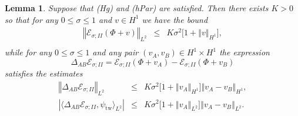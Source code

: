 \documentclass[10pt]{articleHJ}
\newcommand{\abs}[1]{\left\vert#1\right\vert}			%
\newcommand{\norm}[1]{\left\Vert#1\right\Vert}		%
\newtheorem{lem}[thm]{Lemma}
\numberwithin{equation}{section}
\begin{document}
\begin{lem}
Suppose that (Hg) and (hPar) are satisfied.
Then there exists $K > 0$
so that
for any $0 \le \sigma \le 1$
and $v\in H^1$
we have the bound
\begin{equation}
\label{eq:swv:glb:bnd:e:ii}
\begin{array}{lcl}
 \norm{\mathcal{E}_{\sigma;II}(\Phi + v)}_{L^2} & \le &
  K \sigma^2
    \big[ 1 + \norm{v}_{H^1} \big],
\\[0.2cm]
\end{array}
\end{equation}
while for any $0 \le \sigma \le 1$
and any pair $(v_A, v_B) \in H^1 \times H^1$
the expression
\begin{equation}
\Delta_{AB} \mathcal{E}_{\sigma;II}
 = \mathcal{E}_{\sigma;II}
       (\Phi + v_A  )
  - \mathcal{E}_{\sigma;II}
       (\Phi + v_B)
\end{equation}
satisfies the estimates
\begin{equation}
\label{eq:swv:lip:bnd:e:ii}
\begin{array}{lcl}
\norm{\Delta_{AB} \mathcal{E}_{\sigma;II} }_{L^2}
  & \le &
K \sigma^2
   \big[ 1 + \norm{v_A}_{H^1} \big]
     \norm{v_A-v_B}_{H^1} ,
\\[0.2cm]
\abs{\langle
\Delta_{AB} \mathcal{E}_{\sigma;II}
, \psi_{\mathrm{tw}} \rangle_{L^2} }
 & \le &
   K \sigma^2
    \big[ 1 + \norm{v_A}_{L^2} \big]
    \norm{v_A-v_B}_{L^2}.
\end{array}
\end{equation}
\end{lem}
\end{document}
